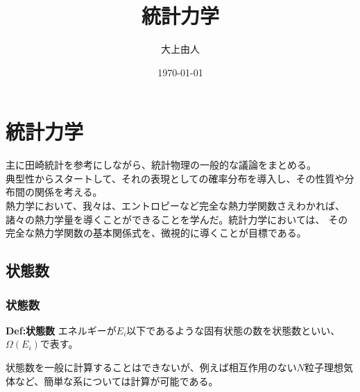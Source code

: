 \documentclass[a4paper,11pt]{jsarticle}
\numberwithin{equation}{section}
\begin{document}
\title{統計力学}
\author{大上由人}
\date{\today}
\maketitle

\tableofcontents

\newpage

\section{統計力学}
主に田崎統計を参考にしながら、統計物理の一般的な議論をまとめる。\\
典型性からスタートして、それの表現としての確率分布を導入し、その性質や分布間の関係を考える。\\

熱力学において、我々は、エントロピーなど完全な熱力学関数さえわかれば、諸々の熱力学量を導くことができることを学んだ。統計力学においては、
その完全な熱力学関数の基本関係式を、微視的に導くことが目標である。\\

\subsection{状態数}
\subsubsection{状態数}
\begin{itembox}[l]{\textbf{Def:状態数}}
  エネルギーが$E_i$以下であるような固有状態の数を状態数といい、$\Omega(E_i)$で表す。
\end{itembox}
状態数を一般に計算することはできないが、例えば相互作用のない$N$粒子理想気体など、簡単な系については計算が可能である。\\
\end{document}
